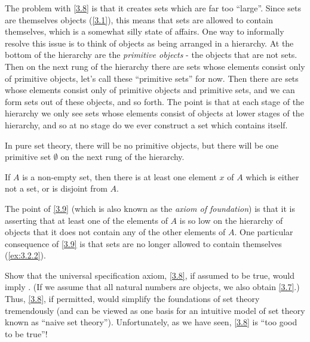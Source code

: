 \begin{note}
  The problem with \cref{3.8} is that it creates sets which are far too ``large''.
  Since sets are themselves objects (\cref{3.1}), this means that sets are allowed to contain themselves, which is a somewhat silly state of affairs.
  One way to informally resolve this issue is to think of objects as being arranged in a hierarchy.
  At the bottom of the hierarchy are the \emph{primitive objects} - the objects that are not sets.
  Then on the next rung of the hierarchy there are sets whose elements consist only of primitive objects, let's call these ``primitive sets'' for now.
  Then there are sets whose elements consist only of primitive objects and primitive sets, and we can form sets out of these objects, and so forth.
  The point is that at each stage of the hierarchy we only see sets whose elements consist of objects at lower stages of the hierarchy, and so at no stage do we ever construct a set which contains itself.
\end{note}

\begin{note}
  In pure set theory, there will be no primitive objects, but there will be one primitive set \(\emptyset\) on the next rung of the hierarchy.
\end{note}

\begin{ax}[Regularity]\label{3.9}
  If \(A\) is a non-empty set, then there is at least one element \(x\) of \(A\) which is either not a set, or is disjoint from \(A\).
\end{ax}

\begin{note}
  The point of \cref{3.9} (which is also known as the \emph{axiom of foundation}) is that it is asserting that at least one of the elements of \(A\) is so low on the hierarchy of objects that it does not contain any of the other elements of \(A\).
  One particular consequence of \cref{3.9} is that sets are no longer allowed to contain themselves (\cref{ex:3.2.2}).
\end{note}

\exercisesection

\begin{ex}\label{ex:3.2.1}
  Show that the universal specification axiom, \cref{3.8}, if assumed to be true, would imply .
  (If we assume that all natural numbers are objects, we also obtain \cref{3.7}.)
  Thus, \cref{3.8}, if permitted, would simplify the foundations of set theory tremendously (and can be viewed as one basis for an intuitive model of set theory known as ``naive set theory'').
  Unfortunately, as we have seen, \cref{3.8} is ``too good to be true''!
\end{ex}

